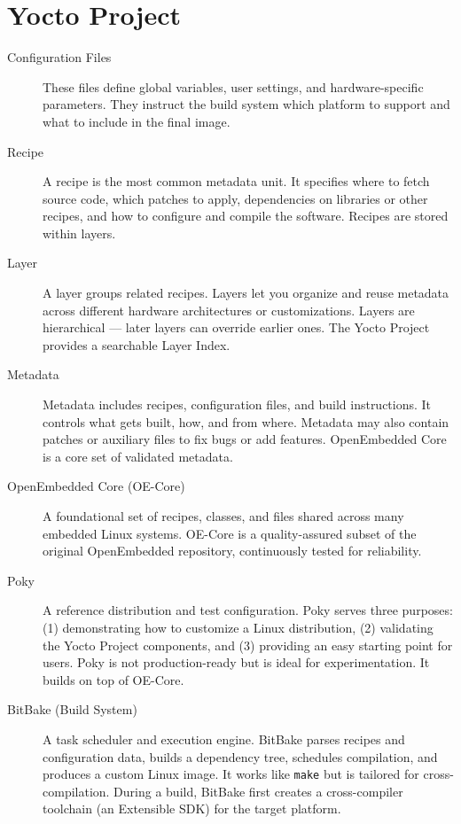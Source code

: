 \section{Yocto Project}
\begin{description}

    \item[Configuration Files]  
    These files define global variables, user settings, and hardware-specific parameters.  
    They instruct the build system which platform to support and what to include in the final image.

    \item[Recipe]  
    A recipe is the most common metadata unit. It specifies where to fetch source code,  
    which patches to apply, dependencies on libraries or other recipes, and how to configure  
    and compile the software. Recipes are stored within layers.

    \item[Layer]  
    A layer groups related recipes. Layers let you organize and reuse metadata across  
    different hardware architectures or customizations. Layers are hierarchical — later  
    layers can override earlier ones. The Yocto Project provides a searchable Layer Index.

    \item[Metadata]  
    Metadata includes recipes, configuration files, and build instructions. It controls  
    what gets built, how, and from where. Metadata may also contain patches or auxiliary  
    files to fix bugs or add features. OpenEmbedded Core is a core set of validated metadata.

    \item[OpenEmbedded Core (OE-Core)]  
    A foundational set of recipes, classes, and files shared across many embedded Linux  
    systems. OE-Core is a quality-assured subset of the original OpenEmbedded repository,  
    continuously tested for reliability.

    \item[Poky]  
    A reference distribution and test configuration. Poky serves three purposes:  
    (1) demonstrating how to customize a Linux distribution, (2) validating the Yocto  
    Project components, and (3) providing an easy starting point for users. Poky is not  
    production-ready but is ideal for experimentation. It builds on top of OE-Core.

    \item[BitBake (Build System)]  
    A task scheduler and execution engine. BitBake parses recipes and configuration data,  
    builds a dependency tree, schedules compilation, and produces a custom Linux image.  
    It works like \texttt{make} but is tailored for cross-compilation. During a build,  
    BitBake first creates a cross-compiler toolchain (an Extensible SDK) for the target platform.


\end{description}
